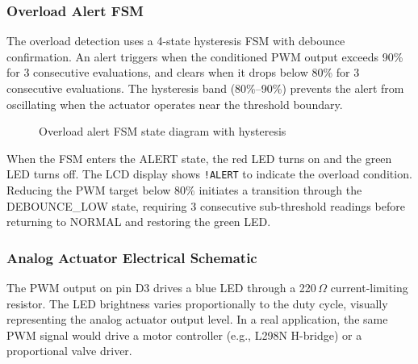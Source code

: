 \subsubsection{Overload Alert FSM}

The overload detection uses a 4-state hysteresis FSM with debounce confirmation. An alert triggers when the conditioned PWM output exceeds 90\% for 3 consecutive evaluations, and clears when it drops below 80\% for 3 consecutive evaluations. The hysteresis band (80\%--90\%) prevents the alert from oscillating when the actuator operates near the threshold boundary.

\begin{figure}[H]
\centering
{}
\caption{Overload alert FSM state diagram with hysteresis}
\label{fig:overload_fsm}
\end{figure}

When the FSM enters the ALERT state, the red LED turns on and the green LED turns off. The LCD display shows \texttt{!ALERT} to indicate the overload condition. Reducing the PWM target below 80\% initiates a transition through the DEBOUNCE\_LOW state, requiring 3 consecutive sub-threshold readings before returning to NORMAL and restoring the green LED.

\subsubsection{Analog Actuator Electrical Schematic}

The PWM output on pin D3 drives a blue LED through a 220\,$\Omega$ current-limiting resistor. The LED brightness varies proportionally to the duty cycle, visually representing the analog actuator output level. In a real application, the same PWM signal would drive a motor controller (e.g., L298N H-bridge) or a proportional valve driver.

